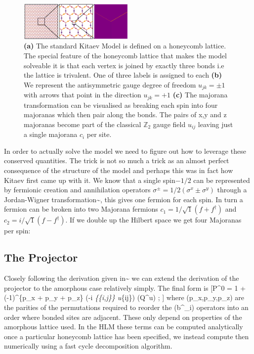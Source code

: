 \begin{figure}
\hypertarget{fig:honeycomb_zoom}{%
\centering
\includegraphics[width=0.5\textwidth,height=\textheight]{figure_code/amk_chapter/honeycomb_zoom/intro_figure_template}
\caption{\textbf{(a)} The standard Kitaev Model is defined on a
honeycomb lattice. The special feature of the honeycomb lattice that
makes the model solveable it is that each vertex is joined by exactly
three bonds i.e the lattice is trivalent. One of three labels is
assigned to each \textbf{(b)} We represent the antisymmetric gauge
degree of freedom \(u_{jk} = \pm 1\) with arrows that point in the
direction \(u_{jk} = +1\) \textbf{(c)} The majorana transformation can
be visualised as breaking each spin into four majoranas which then pair
along the bonds. The pairs of x,y and z majoranas become part of the
classical \(\mathbb{Z}_2\) gauge field \(u_{ij}\) leaving just a single
majorana \(c_i\) per site.}\label{fig:honeycomb_zoom}
}
\end{figure}

In order to actually solve the model we need to figure out how to
leverage these conserved quantities. The trick is not so much a trick as
an almost perfect consequence of the structure of the model and perhaps
this was in fact how Kitaev first came up with it. We know that a single
spin\(-1/2\) can be represented by fermionic creation and annihilation
operators \(\sigma^{\pm} = 1/2(\sigma^x \pm \sigma^y)\) through a
Jordan-Wigner transformation\textasciitilde{}\cite{}, this gives one
fermion for each spin. In turn a fermion can be broken into two Majorana
fermions \(c_1 = 1/\sqrt{1}(f + f^\dagger)\) and
\(c_2 = i/\sqrt{1}(f - f^\dagger)\). If we double up the Hilbert space
we get four Majoranas per spin:

\hypertarget{the-projector}{%
\subsection{The Projector}\label{the-projector}}

Closely following the derivation given in\textasciitilde{}\cite{} we can
extend the derivation of the projector to the amorphous case relatively
simply. The final form is {[}P\^{}0 = 1 + (-1)\^{}\{p\_x + p\_y + p\_z\}
\left(-i \prod\emph{\{\{i,j\}\} u}\{ij\}\right) (Q\^{}u) ;
\hat{\pi} {]} where (p\_x,p\_y,p\_z) are the parities of the
permutations required to reorder the (b\^{}\alpha\_i) operators into an
order where bonded sites are adjacent. These only depend on properties
of the amorphous lattice used. In the HLM these terms can be computed
analytically once a particular honeycomb lattice has been specified, we
instead compute then numerically using a fast cycle decomposition
algorithm.

